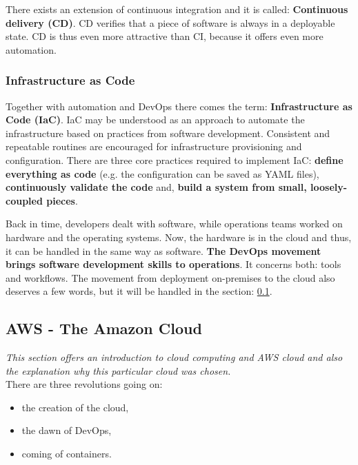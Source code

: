 There exists an extension of continuous integration and it is called: \textbf{Continuous delivery (CD)}. CD verifies that a piece of software is always in a deployable state. CD is thus even more attractive than CI, because it offers even more automation\cite{online-do-cicd}.

\subsubsection{Infrastructure as Code}
Together with automation and DevOps there comes the term: \textbf{Infrastructure as Code (IaC)}. IaC may be understood as an approach to automate the infrastructure based on practices from software development. Consistent and repeatable routines are encouraged for infrastructure provisioning and configuration. There are three core practices required to implement IaC: \textbf{define everything as code} (e.g. the configuration can be saved as YAML files), \textbf{continuously validate the code} and, \textbf{build a system from small, loosely-coupled pieces}\cite{book-iac}.

Back in time, developers dealt with software, while operations teams worked on hardware and the operating systems. Now, the hardware is in the cloud and thus, it can be handled in the same way as software. \textbf{The DevOps movement brings software development skills to operations}. It concerns both: tools and workflows\cite{book-cndwk}. The movement from deployment on-premises to the cloud also deserves a few words, but it will be handled in the section: \ref{section-aws}.

\subsection{AWS - The Amazon Cloud} \label{section-aws}
\textit{This section offers an introduction to cloud computing and AWS cloud and also the explanation why this particular cloud was chosen.}
\\

There are three revolutions going on\cite{book-cndwk}:
\begin{itemize}
\item the creation of the cloud,
\item the dawn of DevOps,
\item coming of containers.
\end{itemize}

